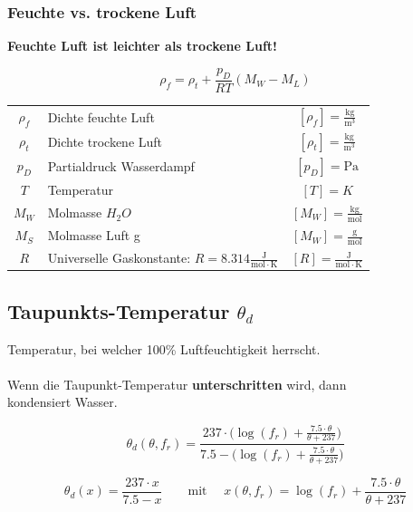 


\subsubsection{Feuchte vs. trockene Luft}

\textbf{Feuchte Luft ist leichter als trockene Luft!}


$$ \boxed{ \rho_f = \rho_t + \frac{p_D}{RT}(M_W - M_L)} $$

\begin{tabular}{c l c}
	\rule{0pt}{10pt}$\rho_f$ & Dichte feuchte Luft & $[\rho_f] = \mathrm{\frac{kg}{m^3}}$ \\
	\rule{0pt}{10pt}$\rho_t$ & Dichte trockene Luft & $[\rho_t] = \mathrm{\frac{kg}{m^3}}$ \\
	\rule{0pt}{10pt}$p_D$ & Partialdruck Wasserdampf & $[p_D] = \mathrm{Pa}$ \\
	\rule{0pt}{10pt}$T$   & Temperatur & $[T] = K$ \\
	\rule{0pt}{10pt}$M_W$ & Molmasse $H_2O$ & $[M_W] = \mathrm{\frac{kg}{mol}}$ \\
	\rule{0pt}{10pt}$M_S$ & Molmasse Luft g & $[M_W] = \mathrm{\frac{g}{mol}}$ \\
	\rule{0pt}{10pt}$R$ & Universelle Gaskonstante: $R = 8.314 \mathrm{\frac{J}{mol \cdot K}}$ & $[R] = \mathrm{\frac{J}{mol \cdot K}} $ \\	
\end{tabular}



\subsection{Taupunkts-Temperatur $\theta_d$}
Temperatur, bei welcher 100\% Luftfeuchtigkeit herrscht. \\
\\
Wenn die Taupunkt-Temperatur \textbf{unterschritten} wird, dann \\
kondensiert Wasser.

$$ \boxed{ \theta_d (\theta, f_r) = \frac{237 \cdot \Big( \log(f_r) + \frac{7.5 \cdot \theta}{\theta + 237}    \Big)}{7.5 - \Big( \log(f_r) + \frac{7.5 \cdot \theta }{\theta + 237} \Big) }  }$$


$$ \boxed{ \theta_d (x) = \frac{237 \cdot x}{7.5 - x}    \qquad  \text{mit } \quad    x(\theta, f_r) = \log(f_r) + \frac{7.5 \cdot \theta}{\theta + 237}  }   $$


